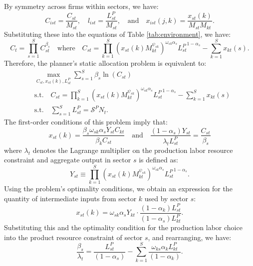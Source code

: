 \documentclass[12pt]{article}
\begin{document}
By symmetry across firms within sectors, we have:
\begin{equation*}
    C_{ist} = \frac{C_{st}}{M_{st}}, \quad l_{ist} = \frac{L_{st}^P}{M_{st}}, \quad \text{and} \quad x_{ist}(j, k) = \frac{x_{st}(k)}{M_{st} M_{kt}}.
\end{equation*}
Substituting these into the equations of Table \ref{tab:environment}, we have:
\begin{equation*}
    C_t = \prod_{s = 1}^S C_{st}^{\beta_s} \quad \text{where} \quad C_{st} = \prod_{k = 1}^S \left(x_{st}(k) M_{kt}^{\psi_{sk}}\right)^{\omega_{sk} \alpha_s} {L_{st}^P}^{1 - \alpha_s} - \sum_{k = 1}^S x_{kt}(s).
\end{equation*}
Therefore, the planner's static allocation problem is equivalent to:
\begin{align*}
    &\max_{C_{st}, x_{st}(k), L_{st}^P} \sum_{s = 1}^S \beta_s \ln(C_{st}) \\
    &\text{s.t.} \quad C_{st} = \prod_{k = 1}^S \left(x_{st}(k) M_{kt}^{\psi_{sk}}\right)^{\omega_{sk} \alpha_s} {L_{st}^P}^{1 - \alpha_s} - \sum_{k = 1}^S x_{kt}(s) \\
    &\text{s.t.} \quad \sum_{s = 1}^S L_{st}^P = \mathcal{S}^P N_t.
\end{align*}
The first-order conditions of this problem imply that:
\begin{equation*}
    x_{st}(k) = \frac{\beta_s \omega_{sk} \alpha_s Y_{st} C_{kt}}{\beta_k C_{st}} \quad \text{and} \quad \frac{(1 - \alpha_s) Y_{st}}{\lambda_t L_{st}^P} = \frac{C_{st}}{\beta_s}
\end{equation*}
where $\lambda_t$ denotes the Lagrange multiplier on the production labor resource constraint and aggregate output in sector $s$ is defined as:
\begin{equation}
    Y_{st} \equiv \prod_{k = 1}^S \left(x_{st}(k) M_{kt}^{\psi_{sk}}\right)^{\omega_{sk} \alpha_s} {L_{st}^P}^{1 - \alpha_s}. \label{eq:aggregate output}
\end{equation}
Using the problem's optimality conditions, we obtain an expression for the quantity of intermediate inputs from sector $k$ used by sector $s$:
\begin{equation}
    x_{st}(k) = \omega_{sk} \alpha_s Y_{kt} \cdot \frac{(1 - \alpha_k) L_{st}^P}{(1 - \alpha_s) L_{kt}^P}. \label{eq:intermediate inputs}
\end{equation}
Substituting this and the optimality condition for the production labor choice into the product resource constraint of sector $s$, and rearranging, we have:
\begin{equation*}
    \frac{\beta_s}{\lambda_t} = \frac{L_{st}^P}{(1 - \alpha_s)} - \sum_{k = 1}^S \frac{\omega_{ks} \alpha_k L_{kt}^P}{(1 - \alpha_k)}.
\end{equation*}
\end{document}

